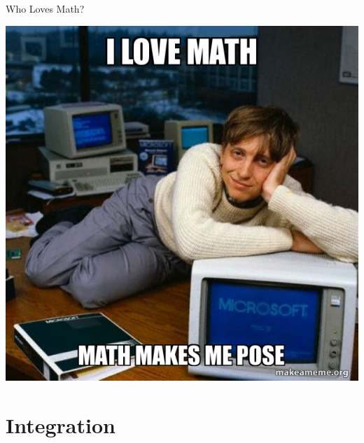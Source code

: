 \documentclass[t]{beamer}
\begin{document}
\begin{frame}{Who Loves Math?}
	\begin{center}
		\includegraphics[scale=0.45]{assets/i-love-math-7791d09576}
	\end{center}
\end{frame}

\section{Integration}
\end{document}
